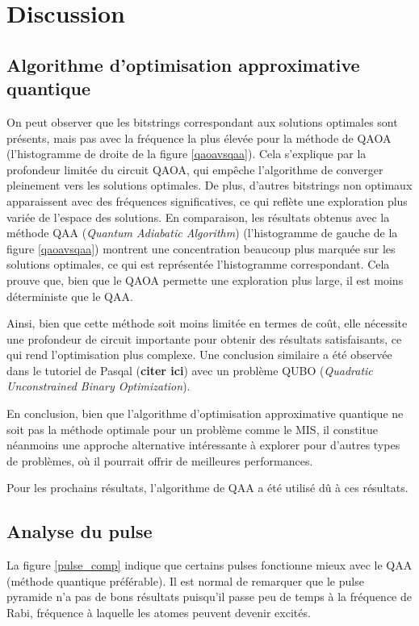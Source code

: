 \documentclass[11pt]{article}
\begin{document}
\section{Discussion}

\subsection{Algorithme d'optimisation approximative quantique}

 On peut observer que les bitstrings correspondant aux solutions optimales sont présents, mais pas avec la fréquence la plus élevée pour la méthode de QAOA (l'histogramme de droite de la figure \ref{qaoavsqaa}). Cela s'explique par la profondeur limitée du circuit QAOA, qui empêche l'algorithme de converger pleinement vers les solutions optimales. De plus, d'autres bitstrings non optimaux apparaissent avec des fréquences significatives, ce qui reflète une exploration plus variée de l'espace des solutions.
En comparaison, les résultats obtenus avec la méthode QAA (\textit{Quantum Adiabatic Algorithm}) (l'histogramme de gauche de la figure \ref{qaoavsqaa}) montrent une concentration beaucoup plus marquée sur les solutions optimales, ce qui est représentée l'histogramme correspondant. Cela prouve que, bien que le QAOA permette une exploration plus large, il est moins déterministe que le QAA.




Ainsi, bien que cette méthode soit moins limitée en termes de coût, elle nécessite une profondeur de circuit importante pour obtenir des résultats satisfaisants, ce qui rend l'optimisation plus complexe. Une conclusion similaire a été observée dans le tutoriel de Pasqal (\textbf{citer ici}) avec un problème QUBO (\textit{Quadratic Unconstrained Binary Optimization}).

En conclusion, bien que l'algorithme d'optimisation approximative quantique ne soit pas la méthode optimale pour un problème comme le MIS, il constitue néanmoins une approche alternative intéressante à explorer pour d'autres types de problèmes, où il pourrait offrir de meilleures performances.

Pour les prochains résultats, l'algorithme de QAA a été utilisé dû à ces résultats.

\subsection{Analyse du pulse}
La figure \ref{pulse_comp} indique que certains pulses fonctionne mieux avec le QAA (méthode quantique préférable). Il est normal de remarquer que le pulse pyramide n'a pas de bons résultats puisqu'il passe peu de temps à la fréquence de Rabi, fréquence à laquelle les atomes peuvent devenir excités.
\end{document}
